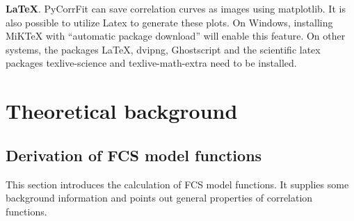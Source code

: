 \noindent \textbf{\LaTeX}.
PyCorrFit can save correlation curves as images using matplotlib. It is also possible to utilize Latex to generate these plots. On Windows, installing MiKTeX  with ``automatic package download'' will enable this feature. On other systems, the packages LaTeX, dvipng, Ghostscript and the scientific latex packages texlive-science and texlive-math-extra need to be installed.


\section{Theoretical background}


\subsection{Derivation of FCS model functions}
This section introduces the calculation of FCS model functions. It supplies some background information and points out general properties of correlation functions.
	
